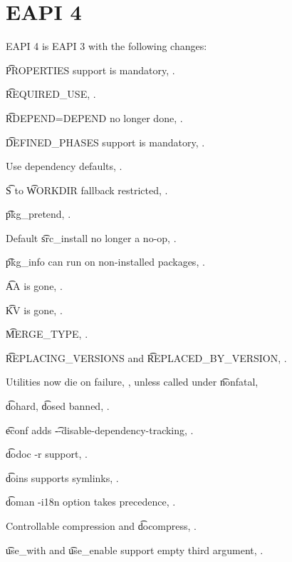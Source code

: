 \section{EAPI 4}

EAPI 4 is EAPI 3 with the following changes:

\begin{compactitem}
\item \t{PROPERTIES} support is mandatory, .
\item \t{REQUIRED_USE}, .
\item \t{RDEPEND=DEPEND} no longer done, .
\item \t{DEFINED_PHASES} support is mandatory, .
\item Use dependency defaults, .
\item \t{S} to \t{WORKDIR} fallback restricted, .
\item \t{pkg_pretend}, .
\item Default \t{src_install} no longer a no-op, .
\item \t{pkg_info} can run on non-installed packages, .
\item \t{AA} is gone, .
\item \t{KV} is gone, .
\item \t{MERGE_TYPE}, .
\item \t{REPLACING_VERSIONS} and \t{REPLACED_BY_VERSION}, .
\item Utilities now die on failure, , unless called under \t{nonfatal},
\item \t{dohard}, \t{dosed} banned, .
\item \t{econf} adds \t{-{}-disable-dependency-tracking}, .
\item \t{dodoc -r} support, .
\item \t{doins} supports symlinks, .
\item \t{doman -i18n} option takes precedence, .
\item Controllable compression and \t{docompress}, .
\item \t{use_with} and \t{use_enable} support empty third argument, .
\end{compactitem}

